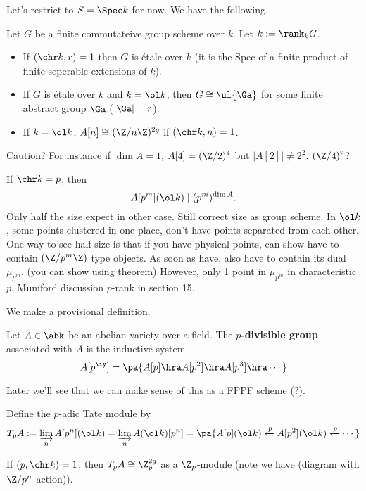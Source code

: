 Let's restrict to $S=\Spec k$ for now. We have the following. 
\begin{fct}
Let $G$ be a finite commutateive group scheme over $k$. Let $k:=\rank_k G$. %
\begin{itemize}
\item
If $(\chr k,r)=1$ then $G$ is \'etale over $k$ (it is the Spec of a finite product of finite seperable extensions of $k$).
\item
If $G$ is \'etale over $k$ and $k=\ol k$, then $G\cong \ul{\Ga} $ for some finite abstract group $\Ga$ ($|\Ga|=r$). 
\item
If $k=\ol k$, $A[n]\cong (\Z/n\Z)^{2g}$ if $(\chr k,n)=1$.
\end{itemize}
\end{fct}
Caution? For instance if $\dim A=1$, $A[4]=(\Z/2)^4$ but $|A[2]|\ne 2^2$. $(\Z/4)^2$?
\begin{rem}
If  $\chr k=p$, then 
\[
A[p^m](\ol k)\mid (p^m)^{\dim A}.
\]
Only half the size expect in other case. Still correct size as group scheme. In $\ol k$, some points clustered in one place, don't have points separated from each other. One way to see half size is that if you have physical points, can show have to contain $(\Z/p^m\Z)$ type objects. As soon as have, also have to contain its dual $\mu_{p^m}$. (you can show using theorem) However, only 1 point in $\mu_{p^m}$ in characteristic $p$. Mumford discussion $p$-rank in section 15. 
\end{rem}
We make a provisional definition.
\begin{df}
Let $A\in \abk$ be an abelian variety over a field. The \textbf{$p$-divisible group} associated with $A$ is the inductive system
\[
A[p^{\iy}]=\pa{
A[p]\hra A[p^2]\hra A[p^3]\hra \cdots 
}
\]
\end{df}
Later we'll see that we can make sense of this as a FPPF scheme (?). 

\begin{df}
Define the $p$-adic Tate module by
\[
T_pA:=\varinjlim_n A[p^n] (\ol k) =\varinjlim_n A(\ol k)[p^n]
=\pa{
A[p](\ol k)\xleftarrow{p} A[p^2](\ol k)\xleftarrow{p}\cdots 
}
\]
\end{df}
If $(p,\chr k)=1$, then $T_pA\cong \Z_p^{2g}$ as a $\Z_p$-module (note we have (diagram with $\Z/p^n$ action)). 

